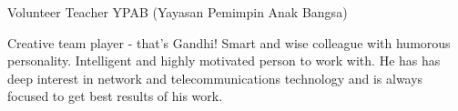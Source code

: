 


\begin{cventries}
  \cventry
    {Volunteer Teacher} %
    {YPAB (Yayasan Pemimpin Anak Bangsa)} %
    {}
    {}
    {}
\end{cventries}

\begin{cvparagraph}
Creative team player - that's Gandhi! Smart and wise colleague with humorous personality. Intelligent and highly motivated person to work with. He has has deep interest in network and telecommunications technology and is always focused to get best results of his work.
\end{cvparagraph}
